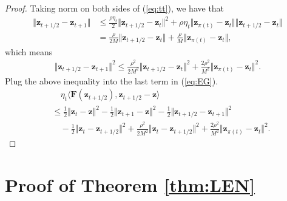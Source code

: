 \documentclass{article}
\def\vz{{\bm{z}}}
\def\mF{{\bm{F}}}
\theoremstyle{plain}
\begin{document}
\begin{proof}
Taking norm on both sides of (\ref{eq:tt}), we have that
\begin{align*}
    \Vert \vz_{t+1/2} - \vz_{t+1} \Vert &\le \frac{\rho \eta_t}{2}  \Vert \vz_{t+1/2} - \vz_t \Vert^2 + \rho \eta_t \Vert \vz_{\pi(t)} - \vz_t \Vert \Vert \vz_{t+1/2} - \vz_t \Vert \\
    &= \frac{\rho}{2 M} \Vert \vz_{t+1/2} - \vz_t \Vert + \frac{\rho}{M}  \Vert \vz_{\pi(t)} - \vz_{t} \Vert,
\end{align*}
which means
\begin{align*}
     \Vert \vz_{t+1/2} - \vz_{t+1} \Vert^2 \leq \frac{\rho^2}{2M^2}\Vert \vz_{t+1/2} - \vz_t \Vert^2 + \frac{2\rho^2}{M^2}  \Vert \vz_{\pi(t)} - \vz_{t} \Vert^2. 
\end{align*}
Plug the above inequality into the last term in (\ref{eq:EG}).
\begin{align*}
    &\quad \eta_t \langle  \mF(\vz_{t+1/2}), \vz_{t+1/2} - \vz \rangle \\
    &\le \frac{1}{2} \Vert \vz_{t} - \vz \Vert^2 - \frac{1}{2} \Vert \vz_{t+1} - \vz \Vert^2  -\frac{1}{2} \Vert \vz_{t+1/2} - \vz_{t+1} \Vert^2 \\
    &\quad - \frac{1}{2} \Vert \vz_t - \vz_{t+1/2} \Vert^2  + \frac{\rho^2}{2 M^2} \Vert \vz_t - \vz_{t+1/2} \Vert^2 + \frac{2 \rho^2}{M^2} \Vert \vz_{\pi(t)} - \vz_t \Vert^2.
\end{align*}
\end{proof}


\section{Proof of Theorem \ref{thm:LEN}} \label{apx:proof-main}
\end{document}

